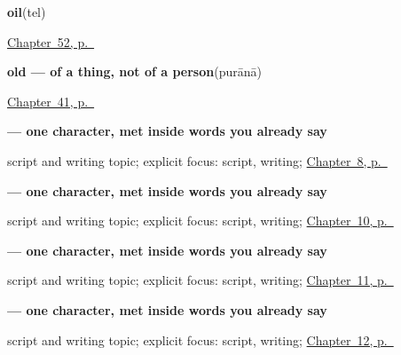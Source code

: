 \noindent\begin{minipage}[t]{\linewidth}
\raggedright
\textbf{oil}\enspace\emph{}\enspace(tel)\par
\footnotesize \hyperref[ch:hi-in-the-kitchen]{Chapter~52, p.~\pageref*{ch:hi-in-the-kitchen}}
\end{minipage}\par\smallskip

\noindent\begin{minipage}[t]{\linewidth}
\raggedright
\textbf{old — of a thing, not of a person}\enspace\emph{}\enspace(purānā)\par
\footnotesize \hyperref[ch:hi-describing-things]{Chapter~41, p.~\pageref*{ch:hi-describing-things}}
\end{minipage}\par\smallskip

\noindent\begin{minipage}[t]{\linewidth}
\raggedright
\textbf{ — one character, met inside words you already say}\par
\footnotesize script and writing topic; explicit focus: script, writing; \hyperref[ch:hi-please]{Chapter~8, p.~\pageref*{ch:hi-please}}
\end{minipage}\par\smallskip

\noindent\begin{minipage}[t]{\linewidth}
\raggedright
\textbf{ — one character, met inside words you already say}\par
\footnotesize script and writing topic; explicit focus: script, writing; \hyperref[ch:hi-days-of-the-week]{Chapter~10, p.~\pageref*{ch:hi-days-of-the-week}}
\end{minipage}\par\smallskip

\noindent\begin{minipage}[t]{\linewidth}
\raggedright
\textbf{ — one character, met inside words you already say}\par
\footnotesize script and writing topic; explicit focus: script, writing; \hyperref[ch:hi-core-colours]{Chapter~11, p.~\pageref*{ch:hi-core-colours}}
\end{minipage}\par\smallskip

\noindent\begin{minipage}[t]{\linewidth}
\raggedright
\textbf{ — one character, met inside words you already say}\par
\footnotesize script and writing topic; explicit focus: script, writing; \hyperref[ch:hi-family]{Chapter~12, p.~\pageref*{ch:hi-family}}
\end{minipage}\par\smallskip

